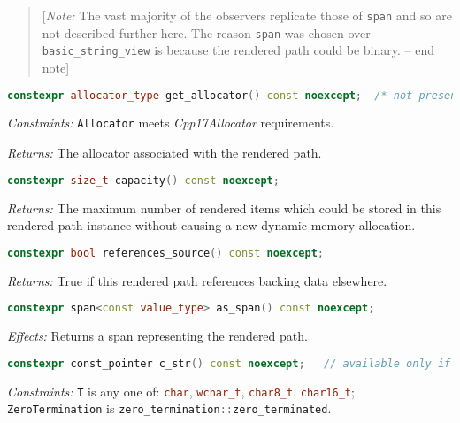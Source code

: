 \documentclass[11pt]{article}
\newcommand{\code}[2][cpp]{\lstinline[language=#1,basicstyle=\small\ttfamily]{#2}}
\newcommand{\desc}[1]{\textit{#1}}
\newcommand{\constraints}{\desc{Constraints: }}
\newcommand{\effects}{\desc{Effects: }}
\newcommand{\returns}{\desc{Returns: }}
\newcommand{\note}[1]{\begin{quote}[\textit{Note:} #1 -- end note]\end{quote}}
\begin{document}
\color{black}

\note{The vast majority of the observers replicate those of \code{span} and so are not described further here. The reason \code{span} was chosen over \code{basic_string_view} is because the rendered path could be binary.}

\color{darkgreen}

\begin{lstlisting}[language=cpp]
    constexpr allocator_type get_allocator() const noexcept;  /* not present if default_rendered_path_allocator tag type was used */
\end{lstlisting}

\constraints \code{Allocator} meets \emph{Cpp17Allocator} requirements.

\returns The allocator associated with the rendered path.\\


\begin{lstlisting}[language=cpp]
    constexpr size_t capacity() const noexcept;
\end{lstlisting}

\returns The maximum number of rendered items which could be stored in this rendered path instance without causing a new dynamic memory allocation.\\


\begin{lstlisting}[language=cpp]
    constexpr bool references_source() const noexcept;
\end{lstlisting}

\returns True if this rendered path references backing data elsewhere.\\


\begin{lstlisting}[language=cpp]
    constexpr span<const value_type> as_span() const noexcept;
\end{lstlisting}

\effects Returns a span representing the rendered path.\\


\begin{lstlisting}[language=cpp]
    constexpr const_pointer c_str() const noexcept;   // available only if zero_terminated and non-byte backing
\end{lstlisting}

\constraints \code{T} is any one of: \code{char}, \code{wchar_t}, \code{char8_t}, \code{char16_t}; \code{ZeroTermination} is \code{zero_termination::zero_terminated}.
\end{document}
